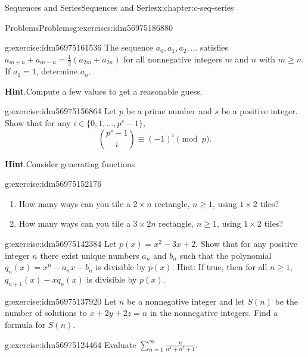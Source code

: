 \documentclass[twoside,10pt,]{book}
\newcommand{\blocktitlefont}{\relax}
\numberwithin{equation}{section}
\begin{document}
\begin{chapterptx}{Sequences and Series}{}{Sequences and Series}{}{}{x:chapter:c-seq-series}
\begin{exercises-section}{Problems}{}{Problems}{}{}{g:exercises:idm56975186880}
\begin{divisionexercise}{9}{}{}{g:exercise:idm56975161536}%
The sequence \(a_0, a_1, a_2,\ldots\) satisfies \(a_{m+n}+a_{m-n}=\frac{1}{2}\left(a_{2m}+a_{2n}\right)\) for all nonnegative integers \(m\) and \(n\) with \(m\geq n\).  If \(a_1= 1\), determine \(a_n\).%
\par\smallskip%
\noindent\textbf{\blocktitlefont Hint}.\hypertarget{g:hint:idm56975160640}{}\quad{}Compute a few values to get a reasonable guess.%
\end{divisionexercise}%
\begin{divisionexercise}{10}{}{}{g:exercise:idm56975156864}%
Let \(p\) be a prime number and \(s\) be a positive integer.  Show that for any \(i \in \{0, 1, \dots,p^s-1\}\),%
\begin{equation*}
\binom{p^s-1}{i} \equiv (-1)^i \pmod{p}.
\end{equation*}
%
\par\smallskip%
\noindent\textbf{\blocktitlefont Hint}.\hypertarget{g:hint:idm56975153952}{}\quad{}Consider generating functions%
\end{divisionexercise}%
\begin{divisionexercise}{11}{}{}{g:exercise:idm56975152176}%
%
\begin{enumerate}[label=(\alph*)]
\item{}How many ways can you tile a \(2 \times  n\) rectangle, \(n\geq 1\), using \(1\times 2\) tiles?%
\item{}How many ways can you tile a \(3 \times  2n\) rectangle, \(n\geq 1\), using \(1\times 2\) tiles?%
\end{enumerate}
%
\end{divisionexercise}%
\begin{divisionexercise}{12}{}{}{g:exercise:idm56975142384}%
Let \(p(x)=x^2-3x + 2\).  Show that for any positive integer \(n\) there exist unique numbers \(a_n\) and \(b_n\) such that the polynomial \(q_n(x)=
x^n-a_nx-b_n\) is divisible by \(p(x)\).    Hint:  If true, then for all \(n\geq 1\),   \(q_{n+1}(x)-x q_n(x)\) is divisible by \(p(x)\).%
\end{divisionexercise}%
\begin{divisionexercise}{13}{}{}{g:exercise:idm56975137920}%
Let \(n\) be a nonnegative integer and let \(S(n)\) be the number of solutions to \(x + 2 y + 2 z = n\) in the nonnegative integers.  Find a formula for \(S(n)\).%
\end{divisionexercise}%
\begin{divisionexercise}{14}{}{}{g:exercise:idm56975124464}%
Evaluate \(\sum_{n=1}^{\infty} \frac{n}{n^4+n^2+1}\).%
\end{divisionexercise}%
\end{exercises-section}
\end{chapterptx}
\end{document}
